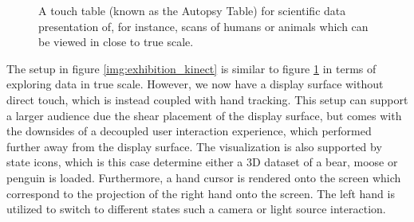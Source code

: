 \documentclass[review,journal]{vgtc}         %
\begin{document}
\begin{figure}[htb]
	\centering
	\caption{A touch table (known as the Autopsy Table) for scientific data presentation of, for instance, scans of humans or animals which can be viewed in close to true scale.}
	\label{img:exhibition_table}
\end{figure}

The setup in figure \ref{img:exhibition_kinect} is similar to figure \ref{img:exhibition_table} in terms of exploring data in true scale. However, we now have a display surface without direct touch, which is instead coupled with hand tracking. This setup can support a larger audience due the shear placement of the display surface, but comes with the downsides of a decoupled user interaction experience, which performed further away from the display surface. The visualization is also supported by state icons, which is this case determine either a 3D dataset of a bear, moose or penguin is loaded. Furthermore, a hand cursor is rendered onto the screen which correspond to the projection of the right hand onto the screen. The left hand is utilized to switch to different states such a camera or light source interaction.
\end{document}

